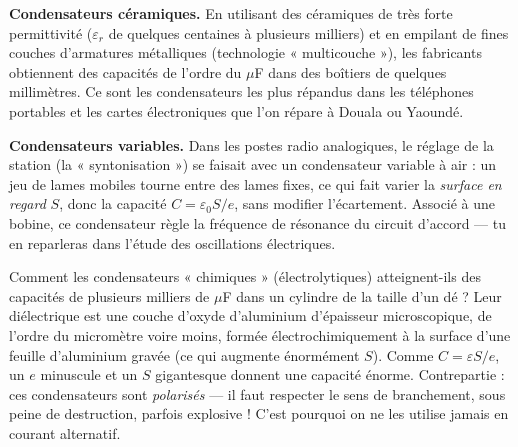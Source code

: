 \documentclass[11pt]{article}
\newcounter{popsec}
\newcounter{popsub}
\newcommand{\courssub}[1]{%
  \stepcounter{popsub}%
  \par\vspace{9pt}\noindent{\popxbold\fontsize{11.5}{13}\selectfont\color{popink}{\color{poporange}\thepopsec.\thepopsub}\hspace{6pt}#1}\par\nopagebreak\vspace{4pt}
}
\begin{document}
\courssub{Applications technologiques}

\textbf{Condensateurs céramiques.} En utilisant des céramiques de très forte permittivité ($\varepsilon_r$ de quelques centaines à plusieurs milliers) et en empilant de fines couches d'armatures métalliques (technologie « multicouche »), les fabricants obtiennent des capacités de l'ordre du $\mu$F dans des boîtiers de quelques millimètres. Ce sont les condensateurs les plus répandus dans les téléphones portables et les cartes électroniques que l'on répare à Douala ou Yaoundé.

\textbf{Condensateurs variables.} Dans les postes radio analogiques, le réglage de la station (la « syntonisation ») se faisait avec un condensateur variable à air : un jeu de lames mobiles tourne entre des lames fixes, ce qui fait varier la \emph{surface en regard} $S$, donc la capacité $C = \varepsilon_0 S/e$, sans modifier l'écartement. Associé à une bobine, ce condensateur règle la fréquence de résonance du circuit d'accord — tu en reparleras dans l'étude des oscillations électriques.

\begin{savaistu}
Comment les condensateurs « chimiques » (électrolytiques) atteignent-ils des capacités de plusieurs milliers de $\mu$F dans un cylindre de la taille d'un dé ? Leur diélectrique est une couche d'oxyde d'aluminium d'épaisseur microscopique, de l'ordre du micromètre voire moins, formée électrochimiquement à la surface d'une feuille d'aluminium gravée (ce qui augmente énormément $S$). Comme $C = \varepsilon S/e$, un $e$ minuscule et un $S$ gigantesque donnent une capacité énorme. Contrepartie : ces condensateurs sont \emph{polarisés} — il faut respecter le sens de branchement, sous peine de destruction, parfois explosive ! C'est pourquoi on ne les utilise jamais en courant alternatif.
\end{savaistu}
\end{document}
